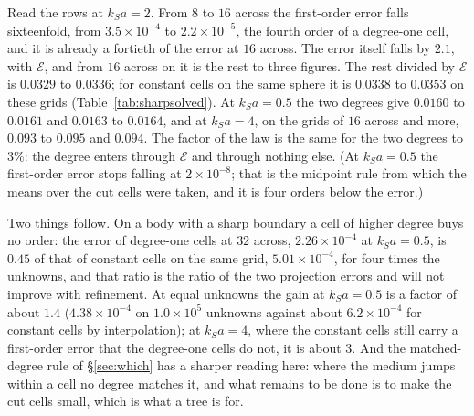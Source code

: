 \documentclass[11pt,a4paper]{article}
\newcommand{\cE}{\mathcal{E}}
\begin{document}
Read the rows at $k_Sa=2$. From $8$ to $16$ across the first-order error falls sixteenfold, from
$3.5\times10^{-4}$ to $2.2\times10^{-5}$, the fourth order of a degree-one cell, and it is already a
fortieth of the error at $16$ across. The error itself falls by $2.1$, with $\cE$, and from $16$ across
on it is the rest to three figures. The rest divided by $\cE$ is $0.0329$ to $0.0336$; for constant
cells on the same sphere it is $0.0338$ to $0.0353$ on these grids (Table~\ref{tab:sharpsolved}). At
$k_Sa=0.5$ the two degrees give $0.0160$ to $0.0161$ and $0.0163$ to $0.0164$, and at $k_Sa=4$, on the
grids of $16$ across and more, $0.093$ to $0.095$ and $0.094$. The factor of the law is the same for the two
degrees to $3\%$: the degree enters through $\cE$ and through nothing else. (At $k_Sa=0.5$ the first-order error stops
falling at $2\times10^{-8}$; that is the midpoint rule from which the means over the cut cells were
taken, and it is four orders below the error.)

Two things follow. On a body with a sharp boundary a cell of higher degree buys no order: the error of
degree-one cells at $32$ across, $2.26\times10^{-4}$ at $k_Sa=0.5$, is $0.45$ of that of constant cells
on the same grid, $5.01\times10^{-4}$, for four times the unknowns, and that ratio is the ratio of the
two projection errors and will not improve with refinement. At equal unknowns the gain at
$k_Sa=0.5$ is a factor of about $1.4$ ($4.38\times10^{-4}$ on $1.0\times10^5$ unknowns against about
$6.2\times10^{-4}$ for constant cells by interpolation); at $k_Sa=4$, where the constant cells still
carry a first-order error that the degree-one cells do not, it is about $3$. And the matched-degree rule of
\S\ref{sec:which} has a sharper reading here: where the medium jumps within a cell no degree matches
it, and what remains to be done is to make the cut cells small, which is what a tree is for.
\end{document}
